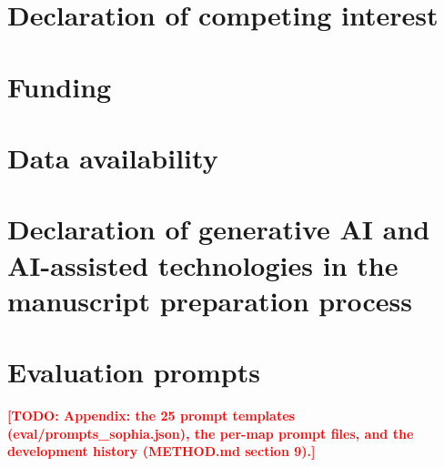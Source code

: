 \documentclass[preprint,12pt]{elsarticle}
\newcommand{\todo}[1]{\textcolor{red}{\textbf{[TODO: #1]}}}
\begin{document}
\section*{Declaration of competing interest}

\section*{Funding}

\section*{Data availability}

\section*{Declaration of generative AI and AI-assisted technologies in the manuscript preparation process}

\appendix
\section{Evaluation prompts}
\label{app:prompts}
\todo{Appendix: the 25 prompt templates (eval/prompts\_sophia.json), the per-map prompt files, and the development history (METHOD.md section 9).}



\end{document}
